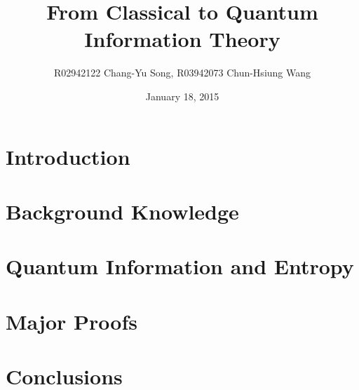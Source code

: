 \documentclass[12pt]{article}
\title{From Classical to Quantum Information Theory}
\author{R02942122 Chang-Yu Song,
        R03942073 Chun-Hsiung Wang}
\date{January 18, 2015}
\begin{document}
\maketitle

\thispagestyle{fancyplain}

\begin{abstract}

\end{abstract}

\section{Introduction}\label{sec:Intro}


\section{Background Knowledge}\label{sec:Background}


\section{Quantum Information and Entropy}\label{sec:QuantumInfo}



\section{Major Proofs}\label{sec_Proof}
%


\section{Conclusions}\label{sec:Conclusion}






\appendix

\end{document}
